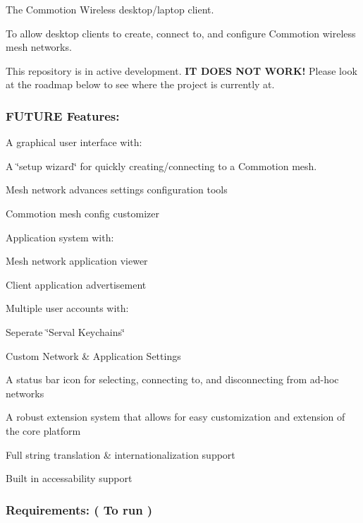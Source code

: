 The Commotion Wireless desktop/laptop client.

To allow desktop clients to create, connect to, and configure Commotion wireless mesh networks.

This repository is in active development. {\bfseries I\+T D\+O\+E\+S N\+O\+T W\+O\+R\+K!} Please look at the roadmap below to see where the project is currently at.

\subsubsection*{F\+U\+T\+U\+R\+E Features\+:}


\begin{DoxyItemize}
\item A graphical user interface with\+:
\item A \char`\"{}setup wizard\char`\"{} for quickly creating/connecting to a Commotion mesh.
\begin{DoxyItemize}
\item Mesh network advances settings configuration tools
\end{DoxyItemize}
\item Commotion mesh config customizer
\item Application system with\+:
\begin{DoxyItemize}
\item Mesh network application viewer
\item Client application advertisement
\end{DoxyItemize}
\item Multiple user accounts with\+:
\begin{DoxyItemize}
\item Seperate \char`\"{}\+Serval Keychains\char`\"{}
\item Custom Network \& Application Settings
\end{DoxyItemize}
\item A status bar icon for selecting, connecting to, and disconnecting from ad-\/hoc networks
\item A robust extension system that allows for easy customization and extension of the core platform
\item Full string translation \& internationalization support
\item Built in accessability support
\end{DoxyItemize}

\subsubsection*{Requirements\+: ( To run )}


